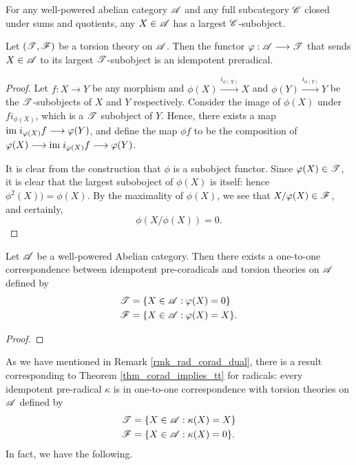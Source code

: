 \begin{por}
For any well-powered abelian category $\mathscr{A}$ and any full 
subcategory $\mathscr{C}$ closed under sums and quotients, any $X \in 
\mathscr{A}$ has a largest $\mathscr{C}$-subobject.
\end{por}

\begin{prop}
Let $(\mathscr{T}, \mathscr{F})$ be a torsion theory on $\mathscr{A}$. Then
the functor $\varphi: \mathscr{A} \longrightarrow \mathscr{T}$ that sends $X \in \mathscr{A}$
to its largest $\mathscr{T}$-subobject is an idempotent preradical.
\end{prop}

\begin{proof}
Let $f: X \to Y$ be any morphism and $\phi(X) 
\stackrel{i_{\phi(X)}}{\to} X$ and 
$\phi(Y)\stackrel{i_{\phi(Y)}}{\to} Y$ be the $\mathscr{T}$-subobjects 
of $X$ and $Y$ respectively. Consider the image of $\phi(X)$ under 
$f i_{\phi(X)}$, which is a $\mathscr{T}$ subobject of $Y$. Hence, 
there exists a map $\mathrm{im}\; i_{\varphi(X)}f \longrightarrow \varphi(Y)$, and define the 
map $\phi f$ to be the composition of $\varphi(X) \longrightarrow \mathrm{im}\; 
i_{\varphi(X)}f \longrightarrow \varphi(Y)$.

It is clear from the construction that $\phi$ is a subobject functor.
Since $\varphi(X) \in \mathscr{T}$, it is clear that the largest suboboject
of $\phi(X)$ is itself: hence $\phi^2(X)) = \phi(X)$. By the 
maximality of $\phi(X)$, we see that $X/\varphi(X) \in \mathscr{F}$, and
certainly, 
\[
\phi(X/\phi(X)) = 0.
\]
\end{proof}

\begin{thm}\label{thm_corad_implies_tt}
Let $\mathscr{A}$ be a well-powered Abelian category. Then there exists
a one-to-one correspondence between idempotent pre-coradicals and
torsion theories on $\mathscr{A}$ defined by
\begin{align*}
\mathscr{T} &= \{ X \in \mathscr{A} : \varphi(X) = 0 \} \\
\mathscr{F} &= \{ X \in \mathscr{A} : \varphi(X) = X \}.
\end{align*}
\end{thm}
\begin{proof}

\end{proof}

As we have mentioned in Remark \ref{rmk_rad_corad_dual}, there is
a result corresponding to Theorem \ref{thm_corad_implies_tt} for 
radicals: every idempotent pre-radical $\kappa$ is in one-to-one 
correspondence with torsion theories on $\mathscr{A}$ defined by
\begin{align*}
\mathscr{T} &= \{ X \in \mathscr{A} : \kappa(X) = X \} \\
\mathscr{F} &= \{ X \in \mathscr{A} : \kappa(X) = 0 \}.
\end{align*}
In fact, we have the following.

